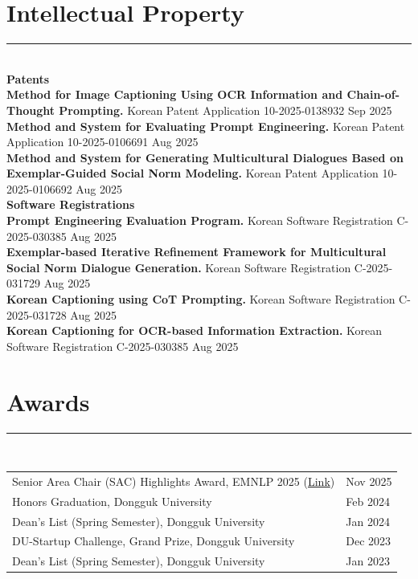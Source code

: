 \documentclass[10pt,letterpaper]{article}
\newcommand{\sectionrule}{\vspace{-0.5em}\rule{\textwidth}{0.4pt}\\[0.2em]}
\newcommand{\cvdate}[1]{\hfill #1}
\begin{document}
\section{Intellectual Property}
\sectionrule
{\large\textbf{Patents}}\\[2pt]
\textbf{Method for Image Captioning Using OCR Information and Chain-of-Thought Prompting.} Korean Patent Application 10-2025-0138932 \cvdate{Sep 2025}\\[2pt]
\textbf{Method and System for Evaluating Prompt Engineering.} Korean Patent Application 10-2025-0106691 \cvdate{Aug 2025}\\[2pt]
\textbf{Method and System for Generating Multicultural Dialogues Based on Exemplar-Guided Social Norm Modeling.} Korean Patent Application 10-2025-0106692 \cvdate{Aug 2025}\\[4pt]
\vspace{2pt}
{\large\textbf{Software Registrations}}\\[2pt]
\textbf{Prompt Engineering Evaluation Program.} Korean Software Registration C-2025-030385 \cvdate{Aug 2025}\\[2pt]
\textbf{Exemplar-based Iterative Refinement Framework for Multicultural Social Norm Dialogue Generation.} Korean Software Registration C-2025-031729 \cvdate{Aug 2025}\\[2pt]
\textbf{Korean Captioning using CoT Prompting.} Korean Software Registration C-2025-031728 \cvdate{Aug 2025}\\[2pt]
\textbf{Korean Captioning for OCR-based Information Extraction.} Korean Software Registration C-2025-030385 \cvdate{Aug 2025}

\section{Awards}
\sectionrule
\begin{tabularx}{\textwidth}{@{}p{}>{\raggedleft\arraybackslash}X@{}}
Senior Area Chair (SAC) Highlights Award, EMNLP 2025 (\href{https://2025.emnlp.org/program/awards/}{Link}) & Nov 2025\\
Honors Graduation, Dongguk University & Feb 2024\\
Dean's List (Spring Semester), Dongguk University & Jan 2024\\
DU-Startup Challenge, Grand Prize, Dongguk University & Dec 2023\\
Dean's List (Spring Semester), Dongguk University & Jan 2023\\
\end{tabularx}
\end{document}
